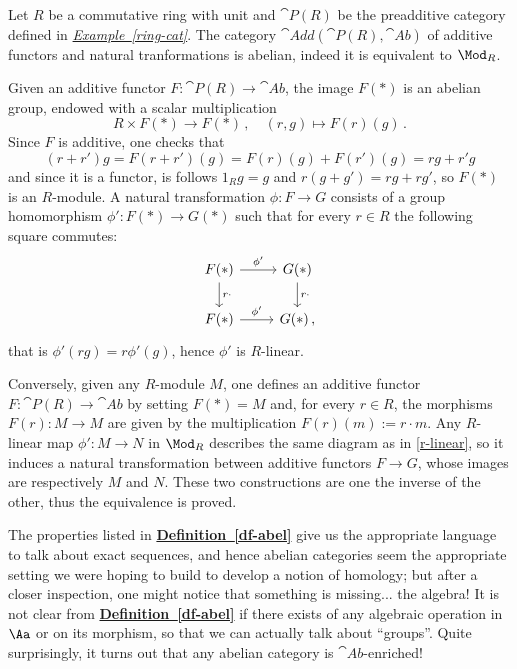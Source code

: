 \begin{ex!}\label{equiv-modr}
    Let $R$ be a commutative ring with unit and $\cat{P}(R)$
    be the preadditive category defined in 
    \hyperref[ring-cat]{\emph{Example~\ref*{ring-cat}}}.
    The category $\cat{Add}(\cat{P}(R),\cat{Ab})$ of additive functors
    and natural tranformations is abelian, indeed it is equivalent
    to $\Mod_{R}$. 
    
    Given an additive functor $F:\cat{P}(R) \to \cat{Ab}$,
    the image $F(\ast)$ is an abelian group, endowed with a scalar multiplication
    \begin{equation*}
        R \times F(\ast) \longrightarrow F(\ast)\,, \quad
        (r,g) \longmapsto F(r)(g)\,.
    \end{equation*}
    Since $F$ is additive, one checks that 
    $$(r+r')g = F(r+r')(g) = F(r)(g)+F(r')(g) = rg +r'g$$
    and since it is a functor, is follows $1_{R}g = g$ and $r(g+g') = rg+rg'$,
    so $F(\ast)$ is an $R$-module. A natural transformation
    $\phi: F \to G$ consists of a group homomorphism
    $\phi' : F(\ast) \to G(\ast)$ such that for every $r \in R$
    the following square commutes:
    \begin{equation}\label{r-linear}
        \begin{tikzcd}
            F(\ast) \ar[r, "\phi'"] \ar[d, "r \cdot "] & G(\ast) \ar[d, "r\cdot"] \\
            F(\ast) \ar[r, "\phi'"] & G(\ast)\,,
        \end{tikzcd}
    \end{equation}
    that is $\phi'(rg) = r\phi'(g)$, hence $\phi'$ is $R$-linear.
    
    Conversely, given any $R$-module $M$, one defines an
    additive functor $F:\cat{P}(R) \to \cat{Ab}$ by setting $F(\ast) = M$
    and, for every $r \in R$, the morphisms $F(r) : M \to M$
    are given by the multiplication $F(r)(m):=r\cdot m$.
    Any $R$-linear map $\phi':M \to N$ in $\Mod_{R}$
    describes the same diagram as in \eqref{r-linear},
    so it induces a natural transformation between
    additive functors $F \to G$, whose images are respectively 
    $M$ and $N$. These two constructions are one the inverse of the other,
    thus the equivalence is proved.
\end{ex!}


The properties listed in 
\hyperref[df-abel]{\textbf{Definition~\ref*{df-abel}}}
give us the appropriate language to talk about exact sequences,
and hence abelian categories seem the appropriate setting
we were hoping to build to develop a notion of homology;
but after a closer inspection, one might notice
that something is missing... the algebra!
It is not clear from \hyperref[df-abel]{\textbf{Definition~\ref*{df-abel}}} 
if there exists of any algebraic operation in $\Aa$ or
on its morphism, so that we can actually talk about ``groups''.
Quite surprisingly, it turns out that any abelian
category is $\cat{Ab}$-enriched!

